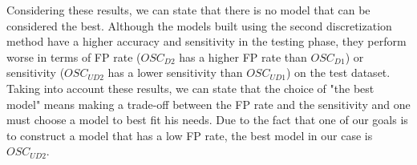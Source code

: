 \par
Considering these results, we can state that there is no model that can be considered the best.  Although the models built using the second discretization method have a higher accuracy and sensitivity in the testing phase, they perform worse in terms of FP rate ({$OSC_{D2}$} has a higher FP rate than {$OSC_{D1}$}) or sensitivity ({$OSC_{UD2}$} has a lower sensitivity than {$OSC_{UD1}$}) on the test dataset. Taking into account these results, we can state that the choice of "the best model" means making a trade-off between the FP rate and the sensitivity and one must choose a model to best fit his needs. Due to the fact that one of our goals is to construct a model that has a low FP rate, the best model in our case is {$OSC_{UD2}$}.